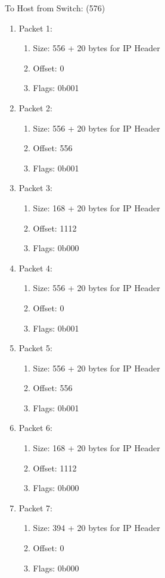 \documentclass[12pt,addpoints,answers]{exam}
\begin{document}
\begin{questions}
\begin{solution}[3in]
	To Host from Switch: (576)
	\begin{enumerate}	
		\item Packet 1: 
		\begin{enumerate}
			\item Size: 556 + 20 bytes for IP Header
			\item Offset: 0
			\item Flags: 0b001
		\end{enumerate}
		\item Packet 2: 
		\begin{enumerate}
			\item Size: 556 + 20 bytes for IP Header
			\item Offset: 556
			\item Flags: 0b001
		\end{enumerate}
		\item Packet 3:
		\begin{enumerate}
			\item Size: 168 + 20 bytes for IP Header
			\item Offset: 1112
			\item Flags: 0b000
		\end{enumerate}
			\item Packet 4: 
		\begin{enumerate}
			\item Size: 556 + 20 bytes for IP Header
			\item Offset: 0
			\item Flags: 0b001
		\end{enumerate}
		\item Packet 5: 
		\begin{enumerate}
			\item Size: 556 + 20 bytes for IP Header
			\item Offset: 556
			\item Flags: 0b001
		\end{enumerate}
		\item Packet 6:
		\begin{enumerate}
			\item Size: 168 + 20 bytes for IP Header
			\item Offset: 1112
			\item Flags: 0b000
		\end{enumerate}
		\item Packet 7:
		\begin{enumerate}
			\item Size: 394 + 20 bytes for IP Header
			\item Offset: 0
			\item Flags: 0b000
		\end{enumerate}
	\end{enumerate}


\end{solution}
\end{questions}
\end{document}
